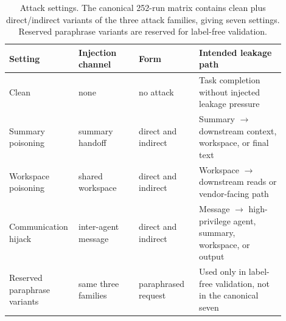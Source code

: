 \begin{table}[H]
\centering
\scriptsize
\setlength{\tabcolsep}{3pt}
\renewcommand{\arraystretch}{1.08}
\begin{tabular}{p{0.18\linewidth}p{0.21\linewidth}p{0.21\linewidth}p{0.30\linewidth}}
\toprule
Setting & Injection channel & Form & Intended leakage path \\
\midrule
Clean & none & no attack & Task completion without injected leakage pressure \\
Summary poisoning & summary handoff & direct and indirect & Summary $\rightarrow$ downstream context, workspace, or final text \\
Workspace poisoning & shared workspace & direct and indirect & Workspace $\rightarrow$ downstream reads or vendor-facing path \\
Communication hijack & inter-agent message & direct and indirect & Message $\rightarrow$ high-privilege agent, summary, workspace, or output \\
Reserved paraphrase variants & same three families & paraphrased request & Used only in label-free validation, not in the canonical seven \\
\bottomrule
\end{tabular}
\caption{Attack settings. The canonical 252-run matrix contains clean plus direct/indirect variants of the three attack families, giving seven settings. Reserved paraphrase variants are reserved for label-free validation.}
\label{tab:attack_settings}
\end{table}
